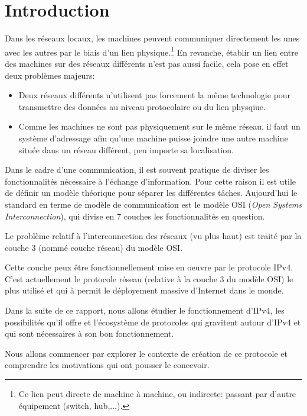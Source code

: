\section{Introduction}
\label{sec:intro}

Dans les réseaux locaux, les machines peuvent communiquer directement les unes
avec les autres par le biais d'un lien physique.\footnote{Ce lien peut directe
de machine à machine, ou indirecte: passant par d'autre équipement (switch,
hub,...).} En revanche, établir un lien entre des machines sur des réseaux
différents n'est pas aussi facile, cela pose en effet deux problèmes majeurs:
\begin{itemize}
\item Deux réseaux différents n'utilisent pas forcement la même technologie
pour transmettre des données au niveau protocolaire ou du lien physqiue.
\item Comme les machines ne sont pas physiquement sur le même réseau, il faut
un système d'adressage afin qu'une machine puisse joindre une autre machine
située dans un réseau différent, peu importe sa localisation.
\end{itemize}

\bigskip
Dans le cadre d'une communication, il est souvent pratique de diviser les
fonctionnalités nécessaire à l'échange d'information.  Pour cette raison il est
utile de définir un modèle théorique pour séparer les différentes tâches.
Aujourd'hui le standard en terme de modèle de communication est le modèle OSI
({\it Open Systems Interconnection}), qui divise en 7 couches les
fonctionnalités en question.

\bigskip
Le problème relatif à l'interconnection des réseaux (vu plus haut) est traité
par la couche 3 (nommé couche réseau) du modèle OSI.

Cette couche peux être fonctionnellement mise en oeuvre par le protocole IPv4.
C'est actuellement le protocole réseau (relative à la couche 3 du modèle OSI)
le plus utilisé et qui à permit le déployement massive d'Internet dans le
monde.

Dans la suite de ce rapport, nous allons étudier le fonctionnement d'IPv4, les
possibilités qu'il offre et l'écosystème de protocoles qui gravitent autour
d'IPv4 et qui sont nécessaires à son bon fonctionnement.

Nous allons commencer par explorer le contexte de création de ce protocole et
comprendre les motivations
qui ont pousser le concevoir.


